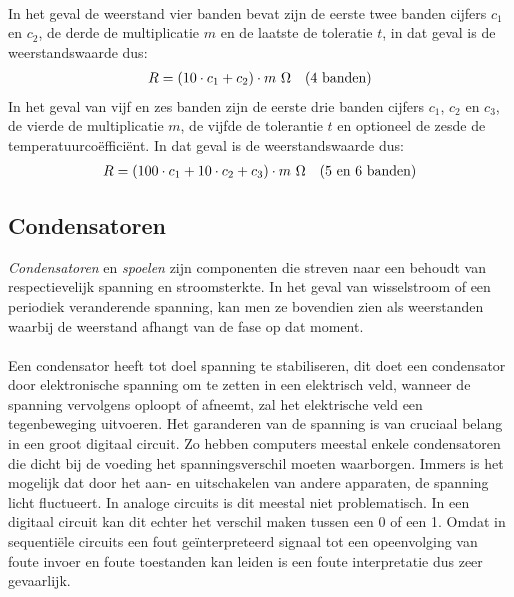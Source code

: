 \paragraph{}
In het geval de weerstand vier banden bevat zijn de eerste twee banden cijfers $c_1$ en $c_2$, de derde de multiplicatie $m$ en de laatste de toleratie $t$, in dat geval is de weerstandswaarde dus:
\begin{equation}
\begin{array}{lr}
R=\left( 10\cdot c_1+c_2 \right)\cdot m~\Omega&\mbox{($4$ banden)}
\end{array}
\end{equation}
In het geval van vijf en zes banden zijn de eerste drie banden cijfers $c_1$, $c_2$ en $c_3$, de vierde de multiplicatie $m$, de vijfde de tolerantie $t$ en optioneel de zesde de temperatuurco\"effici\"ent. In dat geval is de weerstandswaarde dus:
\begin{equation}
\begin{array}{lr}
R=\left( 100\cdot c_1+10\cdot c_2+c_3 \right)\cdot m~\Omega&\mbox{($5$ en $6$ banden)}
\end{array}
\end{equation}
\subsection{Condensatoren}
\emph{Condensatoren} en \emph{spoelen} zijn componenten die streven naar een behoudt van respectievelijk spanning en stroomsterkte. In het geval van wisselstroom of een periodiek veranderende spanning, kan men ze bovendien zien als weerstanden waarbij de weerstand afhangt van de fase op dat moment.
\paragraph{}
Een condensator heeft tot doel spanning te stabiliseren, dit doet een condensator door elektronische spanning om te zetten in een elektrisch veld, wanneer de spanning vervolgens oploopt of afneemt, zal het elektrische veld een tegenbeweging uitvoeren. Het garanderen van de spanning is van cruciaal belang in een groot digitaal circuit. Zo hebben computers meestal enkele condensatoren die dicht bij de voeding het spanningsverschil moeten waarborgen. Immers is het mogelijk dat door het aan- en uitschakelen van andere apparaten, de spanning licht fluctueert. In analoge circuits is dit meestal niet problematisch. In een digitaal circuit kan dit echter het verschil maken tussen een 0 of een 1. Omdat in sequenti\"ele circuits een fout ge\"interpreteerd signaal tot een opeenvolging van foute invoer en foute toestanden kan leiden is een foute interpretatie dus zeer gevaarlijk.
